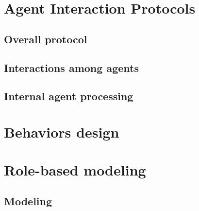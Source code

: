 \documentclass[a4paper,11pt]{report}
\begin{document}
  
  
  
  
  \section{Agent Interaction Protocols} %
  
  
  \subsection{Overall protocol} %
  
  
  \subsection{Interactions among agents}
  
  
  \subsection{Internal agent processing}


  
  
  \section{Behaviors design} %
  

  
  
  \clearpage %
  
  \section{Role-based modeling} %
  
  \subsection{Modeling}
  
\end{document}
